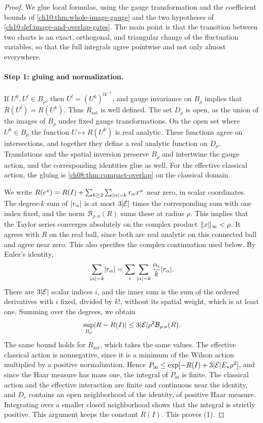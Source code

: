 \begin{proof}
We glue local formulas, using the gauge transformation and the coefficient bounds of \cref{ch10:thm:whole-image-gauge} and the two hypotheses of \cref{ch10:def:image-and-overlap-gates}. The main point is that the transition between two charts is an exact, orthogonal, and triangular change of the fluctuation variables, so that the full integrals agree pointwise and not only almost everywhere.

\paragraph{Step 1: gluing and normalization.}
If $U^k,U^l\in B_\rho$, then $U^l=(U^k)^{lk^{-1}}$, and gauge invariance on $B_\rho$ implies that $R(U^l)=R(U^k)$. Thus $R_{\mathrm{sat}}$ is well defined. The set $D_\rho$ is open, as the union of the images of $B_\rho$ under fixed gauge transformations. On the open set where $U^k\in B_\rho$ the function $U\mapsto R(U^k)$ is real analytic. These functions agree on intersections, and together they define a real analytic function on $D_\rho$. Translations and the spatial inversion preserve $B_\rho$ and intertwine the gauge action, and the corresponding identities glue as well. For the effective classical action, the gluing is \cref{ch08:thm:compact-overlap} on the classical domain.

We write $R(e^x)=R(I)+\sum_{k\ge2}\sum_{\lvert \alpha\rvert=k}r_\alpha x^\alpha$ near zero, in scalar coordinates. The degree-$k$ sum of $\lvert r_\alpha\rvert$ is at most $3\lvert \mathcal E\rvert$ times the corresponding sum with one index fixed, and the norm $\mathcal B_{\rho,a}(R)$ sums these at radius $\rho$. This implies that the Taylor series converges absolutely on the complex product $\lVert x\rVert_\infty<\rho$. It agrees with $R$ on the real ball, since both are real analytic on this connected ball and agree near zero. This also specifies the complex continuation used below. By Euler's identity,
\[
 \sum_{\lvert \alpha\rvert=k}\lvert r_\alpha\rvert=\sum_i\sum_{\lvert \alpha\rvert=k}\frac{\alpha_i}k\lvert r_\alpha\rvert.
\]
There are $3\lvert \mathcal E\rvert$ scalar indices $i$, and the inner sum is the sum of the ordered derivatives with $i$ fixed, divided by $k!$, without its spatial weight, which is at least one. Summing over the degrees, we obtain
\begin{equation}\label{ch10:eq:oscillation}
 \sup_{B_\rho}\lvert R-R(I)\rvert\le3\lvert \mathcal E\rvert\rho^2\mathcal B_{\rho,a}(R).
\end{equation}
The same bound holds for $R_{\mathrm{sat}}$, which takes the same values. The effective classical action is nonnegative, since it is a minimum of the Wilson action multiplied by a positive normalization. Hence $P_{\mathrm{in}}\le\exp[-R(I)+3\lvert \mathcal E\rvert E_*\rho^2]$, and since the Haar measure has mass one, the integral of $P_{\mathrm{in}}$ is finite. The classical action and the effective interaction are finite and continuous near the identity, and $D_r$ contains an open neighborhood of the identity, of positive Haar measure. Integrating over a smaller closed neighborhood shows that the integral is strictly positive. This argument keeps the constant $R(I)$. This proves (1).


\end{proof}
